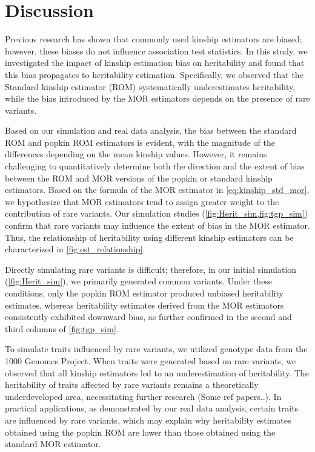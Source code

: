 \documentclass[11pt]{article}
\begin{document}
\section{Discussion}

Previous research has shown that commonly used kinship estimators are biased; however, these biases do not influence association test statistics. In this study, we investigated the impact of kinship estimation bias on heritability and found that this bias propagates to heritability estimation. Specifically, we observed that the Standard kinship estimator (ROM) systematically underestimates heritability, while the bias introduced by the MOR estimators depends on the presence of rare variants.



Based on our simulation and real data analysis, the bias between the standard ROM and popkin ROM estimators is evident, with the magnitude of the differences depending on the mean kinship values. However, it remains challenging to quantitatively determine both the direction and the extent of bias between the ROM and MOR versions of the popkin or standard kinship estimators. Based on the formula of the MOR estimator in \cref{eq:kinship_std_mor}, we hypothesize that MOR estimators tend to assign greater weight to the contribution of rare variants. Our simulation studies (\cref{fig:Herit_sim,fig:tgp_sim}) confirm that rare variants may influence the extent of bias in the MOR estimator. Thus, the relationship of heritability using different kinship estimators can be characterized in \cref{fig:est_relationship}.

Directly simulating rare variants is difficult; therefore, in our initial simulation (\cref{fig:Herit_sim}), we primarily generated common variants. Under these conditions, only the popkin ROM estimator produced unbiased heritability estimates, whereas heritability estimates derived from the MOR estimators consistently exhibited downward bias, as further confirmed in the second and third columns of \cref{fig:tgp_sim}.

To simulate traits influenced by rare variants, we utilized genotype data from the 1000 Genomes Project. When traits were generated based on rare variants, we observed that all kinship estimators led to an underestimation of heritability. The heritability of traits affected by rare variants remains a theoretically underdeveloped area, necessitating further research (Some ref papers..). In practical applications, as demonstrated by our real data analysis, certain traits are influenced by rare variants, which may explain why heritability estimates obtained using the popkin ROM are lower than those obtained using the standard MOR estimator.
\end{document}
